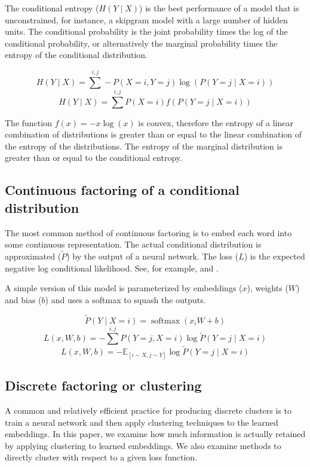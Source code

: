 \documentclass[11pt,letterpaper]{article}
\begin{document}
The conditional entropy ($H(Y \mid X)$) is the best performance of a model that is unconstrained, for instance, a skipgram model with a large number of hidden units. The conditional probability is the joint probability times the log of the conditional probability, or alternatively the marginal probability times the entropy of the conditional distribution.

\setlength{\thinmuskip}{0mu}
\setlength{\medmuskip}{0mu}
\setlength{\thickmuskip}{0mu} 
$$H(Y \mid X)=\sum^{i,j} - P(X=i, Y=j) \log(P(Y=j \mid X=i)) $$
$$H(Y \mid X)= \sum^{i,j}  P(X=i) f(P(Y=j \mid X=i))$$

The function $f(x)=-x \log(x)$ is convex, therefore the entropy of a linear combination of distributions is greater than or equal to the linear combination of the entropy of the distributions. The entropy of the marginal distribution is greater than or equal to the conditional entropy.

\subsection{Continuous factoring of a conditional distribution}

The most common method of continuous factoring is to embed each word into some continuous representation. The actual conditional distribution is approximated ($\tilde{P}$) by the output of a neural network. The loss ($L$) is the expected negative log conditional likelihood. See, for example, \cite{DBLP:journals/corr/MikolovSCCD13} and \cite{DBLP:journals/corr/abs-1301-3781}. 

A simple version of this model is parameterized by embeddings ($x$), weights ($W$) and bias ($b$) and uses a softmax to squash the outputs.

$$ \tilde{P}(Y\mid X=i) = \operatorname{softmax}(x_i W+b)$$
$$ L(x,W,b) = -\sum^{i, j} P(Y=j,X=i) \log \tilde{P}(Y=j \mid X=i) $$
$$ L(x,W,b) = -\mathbb{E}_{[i \sim X, j \sim Y]} \log \tilde{P}(Y=j \mid X=i) $$

\subsection{Discrete factoring or clustering}

A common and relatively efficient practice for producing discrete clusters is to train a neural network and then apply clustering techniques to the learned embeddings. In this paper, we examine how much information is actually retained by applying clustering to learned embeddings. We also examine methods to directly cluster with respect to a given loss function.
\end{document}

